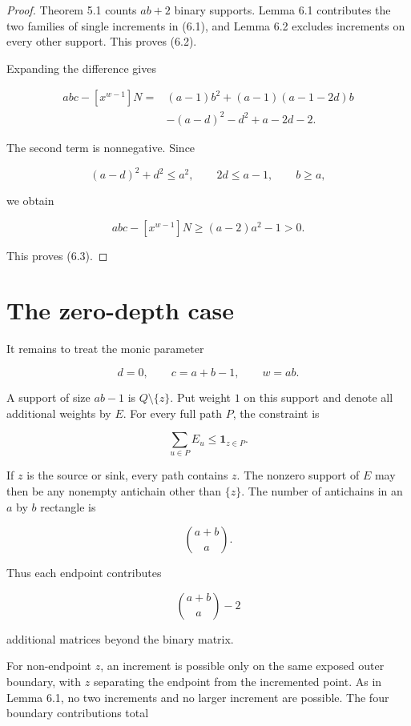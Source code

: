 \documentclass[11pt]{article}
\numberwithin{equation}{section}
\begin{document}
\begin{proof}

Theorem 5.1 counts $ab+2$ binary supports. Lemma 6.1 contributes the two
families of single increments in (6.1), and Lemma 6.2 excludes increments
on every other support. This proves (6.2).

Expanding the difference gives

\nopagebreak[4]
\[
\begin{aligned}
abc-[x^{w-1}]N
={}&(a-1)b^2+(a-1)(a-1-2d)b\\
&-(a-d)^2-d^2+a-2d-2.
\end{aligned}
\tag{6.4}
\]

The second term is nonnegative. Since

\nopagebreak[4]
\[
(a-d)^2+d^2\le a^2,\qquad
2d\le a-1,\qquad b\ge a,
\]

we obtain

\nopagebreak[4]
\[
abc-[x^{w-1}]N
\ge(a-2)a^2-1>0.
\]

This proves (6.3).
\end{proof}


\section{The zero-depth case}


It remains to treat the monic parameter

\nopagebreak[4]
\[
d=0,\qquad c=a+b-1,\qquad w=ab.
\]

A support of size $ab-1$ is $Q\setminus\{z\}$. Put weight $1$ on this
support and denote all additional weights by $E$. For every full path $P$,
the constraint is

\nopagebreak[4]
\[
\sum_{u\in P}E_u\le\mathbf1_{z\in P}.
\tag{7.1}
\]

If $z$ is the source or sink, every path contains $z$. The nonzero support
of $E$ may then be any nonempty antichain other than $\{z\}$. The number of
antichains in an $a$ by $b$ rectangle is

\nopagebreak[4]
\[
\binom{a+b}{a}.
\]

Thus each endpoint contributes

\nopagebreak[4]
\[
\binom{a+b}{a}-2
\]

additional matrices beyond the binary matrix.

For non-endpoint $z$, an increment is possible only on the same exposed
outer boundary, with $z$ separating the endpoint from the incremented
point. As in Lemma 6.1, no two increments and no larger increment are
possible. The four boundary contributions total
\end{document}
